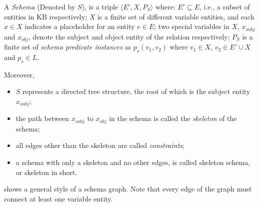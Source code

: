 \begin{definition}
A \textit{Schema} (Denoted by $S$), is a triple
$\langle E', X, P_S \rangle$ where:
  $E' \subseteq E$, i.e.,
  a subset of entities in KB respectively;
  $X$ is a finite set of different variable entities, and  each $x \in X$
  indicates a placeholder for an entity $e \in E$;
  two special variables in $X$, $x_{subj}$ and $x_{obj}$, denote the
  subject and object entity of the relation respectively;
  $P_S$ is a finite set of \textit{schema predicate instances} as
  $p_s(v_1, v_2)$ where $v_1 \in X$, $v_2 \in E' \cup X$
  and $p_s \in L$.

Moreover,
\begin{itemize}
  \itemsep0em
  \item $S$ represents a directed tree structure, the root of which is 
the subject entity $x_{subj}$;
  \item the path between $x_{subj}$  to $x_{obj}$ in the schema is called
	the {\em skeleton} of the schema;
  \item all edges other than the skeleton are called {\em constraints};
  \item a schema with only a skeleton and no other edges, is called
	 skeleton schema, or skeleton in short.
\end{itemize}

\end{definition}
 shows a general style of a schema graph.
Note that every edge of the graph must connect at least one variable entity.

